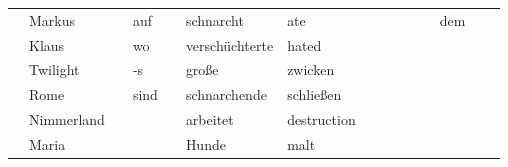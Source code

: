 \begin{center}
\begin{tabular}{lllllllllllllll}
       &     Markus &                       &     auf &          &             schnarcht &                                     ate &                                         &                                                    &                                         &                                                    &                                         &                                     dem &          &        \\
       &      Klaus &                       &      wo &          &        verschüchterte &                                   hated &                                         &                                                    &                                         &                                                    &                                         &                                         &          &        \\
       &   Twilight &                       &      -s &          &                 große &                                 zwicken &                                         &                                                    &                                         &                                                    &                                         &                                         &          &        \\
       &       Rome &                       &    sind &          &          schnarchende &                               schließen &                                         &                                                    &                                         &                                                    &                                         &                                         &          &        \\
       & Nimmerland &                       &         &          &              arbeitet &                             destruction &                                         &                                                    &                                         &                                                    &                                         &                                         &          &        \\
       &      Maria &                       &         &          &                 Hunde &                                    malt &                                         &                                                    &                                         &                                                    &                                         &                                         &          &        \\

\end{tabular}
\end{center}

